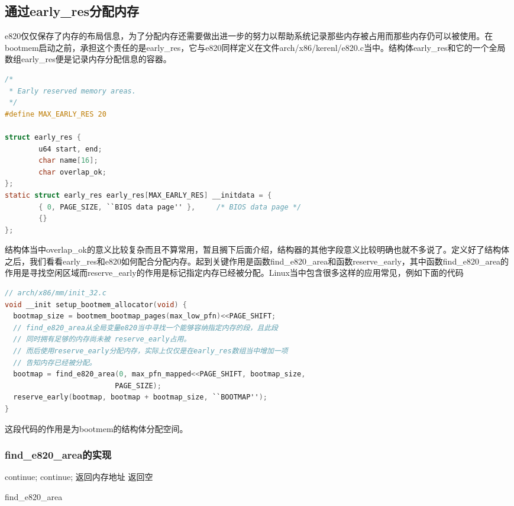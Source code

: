 \documentclass[b5paper,9pt,twoside,openany]{article}
\begin{document}
\subsection{通过early\_res分配内存}
e820仅仅保存了内存的布局信息，为了分配内存还需要做出进一步的努力以帮助系统记录那些内存被占用而那些内存仍可以被使用。在bootmem启动之前，承担这个责任的是early\_res，它与e820同样定义在文件arch/x86/kerenl/e820.c当中。结构体early\_res和它的一个全局数组early\_res便是记录内存分配信息的容器。
\begin{lstlisting}[language=C]
/*
 * Early reserved memory areas.
 */
#define MAX_EARLY_RES 20

struct early_res {
        u64 start, end;
        char name[16];
        char overlap_ok;
};
static struct early_res early_res[MAX_EARLY_RES] __initdata = {
        { 0, PAGE_SIZE, ``BIOS data page'' },     /* BIOS data page */
        {}
};
\end{lstlisting}
结构体当中overlap\_ok的意义比较复杂而且不算常用，暂且搁下后面介绍，结构器的其他字段意义比较明确也就不多说了。定义好了结构体之后，我们看看early\_res和e820如何配合分配内存。起到关键作用是函数find\_e820\_area和函数reserve\_early，其中函数find\_e820\_area的作用是寻找空闲区域而reserve\_early的作用是标记指定内存已经被分配。Linux当中包含很多这样的应用常见，例如下面的代码

\begin{lstlisting}[language=C]
// arch/x86/mm/init_32.c
void __init setup_bootmem_allocator(void) {
  bootmap_size = bootmem_bootmap_pages(max_low_pfn)<<PAGE_SHIFT;
  // find_e820_area从全局变量e820当中寻找一个能够容纳指定内存的段，且此段
  // 同时拥有足够的内存尚未被 reserve_early占用。
  // 而后使用reserve_early分配内存，实际上仅仅是在early_res数组当中增加一项
  // 告知内存已经被分配。
  bootmap = find_e820_area(0, max_pfn_mapped<<PAGE_SHIFT, bootmap_size,
                          PAGE_SIZE);
  reserve_early(bootmap, bootmap + bootmap_size, ``BOOTMAP'');
}
\end{lstlisting}
这段代码的作用是为bootmem的结构体分配空间。
\subsubsection{find\_e820\_area的实现}
\begin{algorithm}[H]
\SetAlgoLined
\BlankLine
{} {
   {
    continue;
  }
   {
   continue;
  }
  返回内存地址
}
\BlankLine
返回空

\caption{find\_e820\_area}
\end{algorithm}
\end{document}
